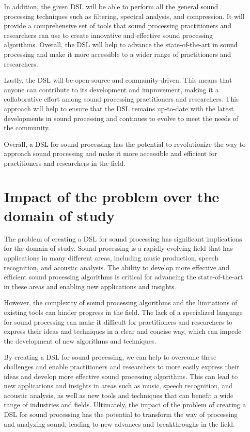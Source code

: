 In addition, the given DSL will be able to perform all the general sound processing techniques such as filtering, spectral analysis, and compression. It will provide a comprehensive set of tools that sound processing practitioners and researchers can use to create innovative and effective sound processing algorithms. Overall, the DSL will help to advance the state-of-the-art in sound processing and make it more accessible to a wider range of practitioners and researchers.

Lastly, the DSL will be open-source and community-driven. This means that anyone can contribute to its development and improvement, making it a collaborative effort among sound processing practitioners and researchers. This approach will help to ensure that the DSL remains up-to-date with the latest developments in sound processing and continues to evolve to meet the needs of the community.

Overall, a DSL for sound processing has the potential to revolutionize the way to approach sound processing and make it more accessible and efficient for practitioners and researchers in the field.

\section{Impact of the problem over the domain of study} 
The problem of creating a DSL for sound processing has significant implications for the domain of study. Sound processing is a rapidly evolving field that has applications in many different areas, including music production, speech recognition, and acoustic analysis. The ability to develop more effective and efficient sound processing algorithms is critical for advancing the state-of-the-art in these areas and enabling new applications and insights.

However, the complexity of sound processing algorithms and the limitations of existing tools can hinder progress in the field. The lack of a specialized language for sound processing can make it difficult for practitioners and researchers to express their ideas and techniques in a clear and concise way, which can impede the development of new algorithms and techniques.

By creating a DSL for sound processing, we can help to overcome these challenges and enable practitioners and researchers to more easily express their ideas and develop more effective sound processing algorithms. This can lead to new applications and insights in areas such as music, speech recognition, and acoustic analysis, as well as new tools and techniques that can benefit a wide range of industries and fields. Ultimately, the impact of the problem of creating a DSL for sound processing has the potential to transform the way of processing and analyzing sound, leading to new advances and breakthroughs in the field.

